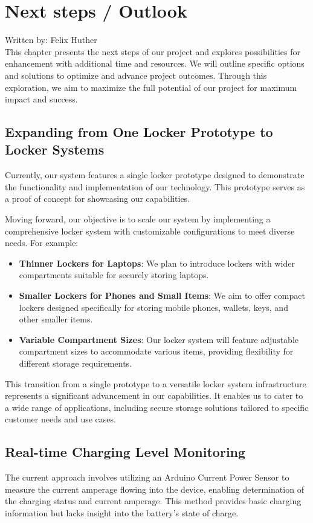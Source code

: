 \section{Next steps / Outlook}
{\tiny Written by: Felix Huther}\\ 


This chapter presents the next steps of our project and explores possibilities 
for enhancement with additional time and resources. 
We will outline specific options and solutions to optimize and advance project outcomes. 
Through this exploration, we aim to maximize the full potential of our project 
for maximum impact and success.

\subsection{Expanding from One Locker Prototype to Locker Systems}

Currently, our system features a single locker prototype designed to demonstrate the functionality and implementation of our technology. This prototype serves as a proof of concept for showcasing our capabilities.

Moving forward, our objective is to scale our system by implementing a comprehensive locker system with customizable configurations to meet diverse needs. For example:

\begin{itemize}
    \item \textbf{Thinner Lockers for Laptops}: We plan to introduce lockers with wider compartments suitable for securely storing laptops.
    \item \textbf{Smaller Lockers for Phones and Small Items}: We aim to offer compact lockers designed specifically for storing mobile phones, wallets, keys, and other smaller items.
    \item \textbf{Variable Compartment Sizes}: Our locker system will feature adjustable compartment sizes to accommodate various items, providing flexibility for different storage requirements.
\end{itemize}

This transition from a single prototype to a versatile locker system infrastructure represents a significant advancement in our capabilities. It enables us to cater to a wide range of applications, including secure storage solutions tailored to specific customer needs and use cases.


\subsection{Real-time Charging Level Monitoring}
The current approach involves utilizing an Arduino Current Power Sensor to measure the
current amperage flowing into the device, 
enabling determination of the charging status and current amperage. 
This method provides basic charging information but lacks insight into the battery's state of charge.

